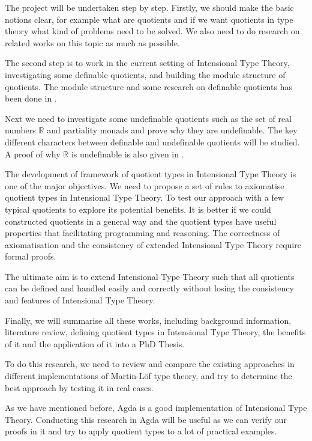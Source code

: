 \documentclass{article}
\theoremstyle{definition}
\newcommand{\R}{\mathbb{R}}
\newcommand{\itt}{Intensional Type Theory}
\newcommand{\mltt}{Martin-L\"{o}f type theory}
\begin{document}
The project will be undertaken step by step. Firstly, we should make
the basic notions clear, for example what are quotients and if we want
quotients in type theory what kind of problems need to be solved. We
also need to do research on related works on this topic as much as
possible.

The second step is to work in the current setting of \itt{},
investigating some definable quotients, and building the module structure of quotients. The module structure
and some research on definable quotients has been done in
\cite{aan}.

Next we need to investigate some undefinable quotients such as the set
of real numbers $\R$ and partiality monads and prove why they are undefinable. The
key different characters between definable and undefinable quotients
will be studied. A proof of why $\R$ is undefinable is also given in
\cite{aan}.

The development of framework of quotient types in \itt{} is one of the major
objectives. We need to propose a set of rules to axiomatise quotient
types in \itt{}. To test our approach with a few typical quotients
to explore its potential benefits. It is better if we could
constructed quotients in a general way and the quotient types have
useful properties that facilitating programming and reasoning.
The correctness of axiomatisation
and the consistency of extended \itt{} require formal proofs.


The ultimate aim is to extend \itt{} such that all quotients can be
defined and handled easily and correctly without losing the consistency
and features of \itt{}.

Finally, we will summarise all these works, including background
information, literature review, defining quotient types in
\itt{}, the benefits of it and the application of it into a PhD Thesis.



To do this research, we need to review and compare
the existing approaches in different implementations of \mltt{},
and try to determine the best approach by testing it in real cases.

As we have mentioned before, Agda is a good implementation of
\itt{}. Conducting this research in Agda will be useful as we can verify our proofs in it and try to apply quotient types
to a lot of practical examples.
\end{document}
